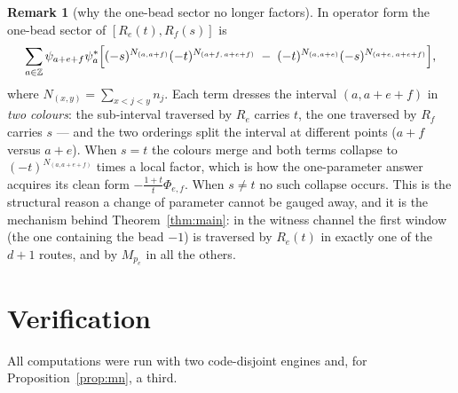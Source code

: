 \documentclass[11pt]{article}
\theoremstyle{definition}
\newtheorem{remark}[theorem]{Remark}
\newcommand{\Z}{\mathbb{Z}}
\begin{document}
\begin{remark}[why the one-bead sector no longer factors]\label{rem:twocolour}
In operator form the one-bead sector of $[R_e(t),R_f(s)]$ is
\[
  \sum_{a\in\Z}\psi_{a+e+f}\psi_a^{*}\Bigl[
     (-s)^{N_{(a,a+f)}}(-t)^{N_{(a+f,\,a+e+f)}}
   \;-\;(-t)^{N_{(a,a+e)}}(-s)^{N_{(a+e,\,a+e+f)}}\Bigr],
\]
where $N_{(x,y)}=\sum_{x<j<y}n_j$.  Each term dresses the interval $(a,a+e+f)$ in
\emph{two colours}: the sub-interval traversed by $R_e$ carries $t$, the one traversed by
$R_f$ carries $s$ --- and the two orderings split the interval at different points
($a+f$ versus $a+e$).  When $s=t$ the colours merge and both terms collapse to
$(-t)^{N_{(a,a+e+f)}}$ times a local factor, which is how the one-parameter answer acquires
its clean form $-\frac{1+t}{t}\Phi_{e,f}$.  When $s\neq t$ no such collapse occurs.  This
is the structural reason a change of parameter cannot be gauged away, and it is the
mechanism behind Theorem~\ref{thm:main}: in the witness channel the first window
(the one containing the bead $-1$) is traversed by $R_e(t)$ in exactly one of the $d+1$
routes, and by $M_{p_e}$ in all the others.
\end{remark}

\section{Verification}\label{sec:verif}

All computations were run with two code-disjoint engines and, for
Proposition~\ref{prop:mn}, a third.
\end{document}
